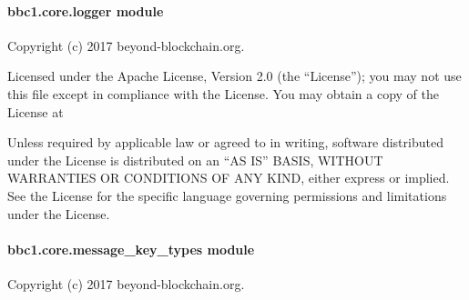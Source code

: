 \documentclass[letterpaper,10pt,english]{sphinxmanual}
\begin{document}
\begin{fulllineitems}
\label{\detokenize{bbc1.core.key_exchange_manager:bbc1.core.key_exchange_manager.remove_old_key}}
\end{fulllineitems}



\paragraph{bbc1.core.logger module}
\label{\detokenize{bbc1.core.logger::doc}}\label{\detokenize{bbc1.core.logger:bbc1-core-logger-module}}\label{\detokenize{bbc1.core.logger:module-bbc1.core.logger}}
Copyright (c) 2017 beyond-blockchain.org.

Licensed under the Apache License, Version 2.0 (the “License”);
you may not use this file except in compliance with the License.
You may obtain a copy of the License at
\begin{quote}

\end{quote}

Unless required by applicable law or agreed to in writing, software
distributed under the License is distributed on an “AS IS” BASIS,
WITHOUT WARRANTIES OR CONDITIONS OF ANY KIND, either express or implied.
See the License for the specific language governing permissions and
limitations under the License.

\begin{fulllineitems}
\label{\detokenize{bbc1.core.logger:bbc1.core.logger.get_logger}}
\end{fulllineitems}



\paragraph{bbc1.core.message\_key\_types module}
\label{\detokenize{bbc1.core.message_key_types::doc}}\label{\detokenize{bbc1.core.message_key_types:module-bbc1.core.message_key_types}}\label{\detokenize{bbc1.core.message_key_types:bbc1-core-message-key-types-module}}
Copyright (c) 2017 beyond-blockchain.org.
\end{document}
